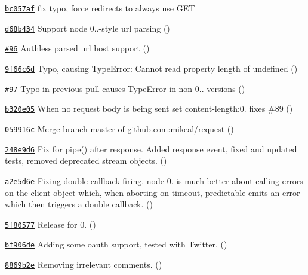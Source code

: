 \begin{DoxyItemize}
\item \href{https://github.com/mikeal/request/commit/bc057affb58272d9152766956e5cde4ea51ca043}{\tt bc057af} fix typo, force redirects to always use G\+E\+T
\item \href{https://github.com/mikeal/request/commit/d68b434693dbf848dff4c570c4249a35329cc24f}{\tt d68b434} Support node 0..-\/style url parsing ()
\item \href{https://github.com/mikeal/request/pull/96}{\tt \#96} Authless parsed url host support ()
\item \href{https://github.com/mikeal/request/commit/9f66c6d79bc6515d870b906df39bd9d6d9164994}{\tt 9f66c6d} Typo, causing \textquotesingle{}Type\+Error\+: Cannot read property \textquotesingle{}length\textquotesingle{} of undefined\textquotesingle{} ()
\item \href{https://github.com/mikeal/request/pull/97}{\tt \#97} Typo in previous pull causes Type\+Error in non-\/0.. versions ()
\item \href{https://github.com/mikeal/request/commit/b320e05f2d84510f47a6b6857d091c8cd4d3ae2e}{\tt b320e05} When no request body is being sent set \textquotesingle{}content-\/length\textquotesingle{}\+:0. fixes \#89 ()
\item \href{https://github.com/mikeal/request/commit/059916c545a0faa953cb8ac66b8c3ae243b1c8ce}{\tt 059916c} Merge branch \textquotesingle{}master\textquotesingle{} of github.\+com\+:mikeal/request ()
\item \href{https://github.com/mikeal/request/commit/248e9d65e73ac868948a82d07feaf33387723a1d}{\tt 248e9d6} Fix for pipe() after response. Added response event, fixed and updated tests, removed deprecated stream objects. ()
\item \href{https://github.com/mikeal/request/commit/a2e5d6e30d3e101f8c5a034ef0401fdde8608ccf}{\tt a2e5d6e} Fixing double callback firing. node 0. is much better about calling errors on the client object which, when aborting on timeout, predictable emits an error which then triggers a double callback. ()
\item \href{https://github.com/mikeal/request/commit/5f805775e6aeaaf229cc781439b29108fb69f373}{\tt 5f80577} Release for 0. ()
\item \href{https://github.com/mikeal/request/commit/bf906de601121b52c433b0af208550f1db892cde}{\tt bf906de} Adding some oauth support, tested with Twitter. ()
\item \href{https://github.com/mikeal/request/commit/8869b2e88cc305e224556c5ca75b7b59311911d9}{\tt 8869b2e} Removing irrelevant comments. ()

\end{DoxyItemize}
